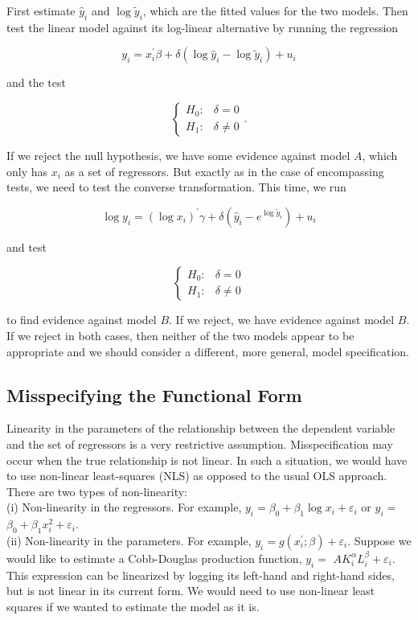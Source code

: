 First estimate $\widehat{y}_{i}$ and $\log \tilde{y}_{i}$, which are the fitted values for the two models. Then test the linear model against its log-linear alternative by running the regression

$$
y_{i}=x_{i}^{\prime} \beta+\delta\left(\log \widehat{y}_{i}-\log \tilde{y}_{i}\right)+u_{i}
$$

and the test

$$
\left\{\begin{array}{ll}
H_{0}: & \delta=0 \\
H_{1}: & \delta \neq 0
\end{array} .\right.
$$

If we reject the null hypothesis, we have some evidence against model $A$, which only has $x_{i}$ as a set of regressors. But exactly as in the case of encompassing tests, we need to test the converse transformation. This time, we run

$$
\log y_{i}=\left(\log x_{i}\right)^{\prime} \gamma+\delta\left(\widehat{y}_{i}-e^{\log \tilde{y}_{i}}\right)+u_{i}
$$

and test

$$
\begin{cases}H_{0}: & \delta=0 \\ H_{1}: & \delta \neq 0\end{cases}
$$

to find evidence against model $B$. If we reject, we have evidence against model $B$. If we reject in both cases, then neither of the two models appear to be appropriate and we should consider a different, more general, model specification.


\subsection{Misspecifying the Functional Form}
Linearity in the parameters of the relationship between the dependent variable and the set of regressors is a very restrictive assumption. Misspecification may occur when the true relationship is not linear. In such a situation, we would have to use non-linear least-squares (NLS) as opposed to the usual OLS approach. There are two types of non-linearity:\\
(i) Non-linearity in the regressors. For example, $y_{i}=\beta_{0}+\beta_{1} \log x_{i}+\varepsilon_{i}$ or $y_{i}=$ $\beta_{0}+\beta_{1} x_{i}^{2}+\varepsilon_{i}$.\\
(ii) Non-linearity in the parameters. For example, $y_{i}=g\left(x_{i}^{\prime} ; \beta\right)+\varepsilon_{i}$. Suppose we would like to estimate a Cobb-Douglas production function, $y_{i}=$ $A K_{i}^{\alpha} L_{i}^{\beta}+\varepsilon_{i}$. This expression can be linearized by logging its left-hand and right-hand sides, but is not linear in its current form. We would need to use non-linear least squares if we wanted to estimate the model as it is.

